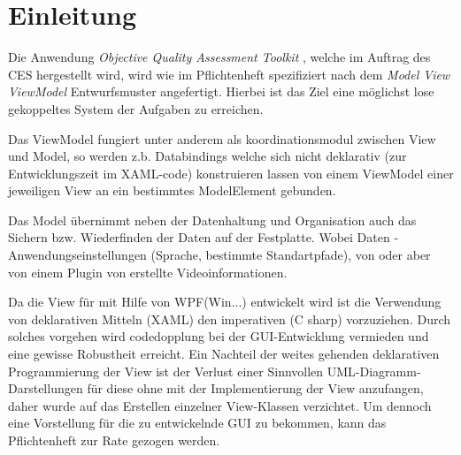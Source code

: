\chapter{Einleitung}

Die Anwendung \emph{Objective Quality Assessment Toolkit} , welche im Auftrag des CES hergestellt wird, wird wie im Pflichtenheft spezifiziert nach dem \emph{Model View ViewModel} Entwurfsmuster angefertigt.
Hierbei ist das Ziel eine möglichst lose gekoppeltes System der Aufgaben zu erreichen.

Das ViewModel fungiert unter anderem als koordinationsmodul
zwischen View und Model, so werden z.b. Databindings welche
sich nicht deklarativ (zur Entwicklungszeit im XAML-code)
konstruieren lassen von einem ViewModel einer jeweiligen View
an ein bestimmtes ModelElement gebunden.

Das Model übernimmt neben der Datenhaltung und Organisation
auch das Sichern bzw. Wiederfinden der Daten auf der Festplatte.
Wobei Daten \projektTitel-Anwendungseinstellungen (Sprache, bestimmte
Standartpfade), von \projektTitel oder
aber von einem Plugin von \projektTitel erstellte Videoinformationen.

Da die View für \projektTitel mit Hilfe von WPF(Win...) entwickelt 
wird ist die Verwendung von deklarativen Mitteln (XAML) den
imperativen (C sharp) vorzuziehen. Durch solches vorgehen wird
codedopplung bei der GUI-Entwicklung vermieden und eine
gewisse Robustheit erreicht. Ein Nachteil der weites gehenden deklarativen
Programmierung der View ist der Verlust einer Sinnvollen
UML-Diagramm-Darstellungen für diese ohne mit der Implementierung 
der View anzufangen, daher wurde auf das Erstellen einzelner View-Klassen
verzichtet. Um dennoch eine Vorstellung für die zu entwickelnde GUI 
zu bekommen, kann das Pflichtenheft zur Rate gezogen werden.
